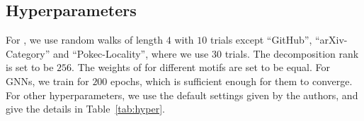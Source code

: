 



 


\subsection{Hyperparameters} \label{ssec:hyper}
For \method, we use random walks of length $4$ with $10$ trials except ``GitHub'', ``arXiv-Category'' and ``Pokec-Locality'', where we use $30$ trials. 
The decomposition rank is set to be $256$.
The weights of \hols for different motifs are set to be equal.
For GNNs, we train for $200$ epochs, which is sufficient enough for them to converge. 
For other hyperparameters, we use the default settings given by the authors, and give the details in Table~\ref{tab:hyper}.

